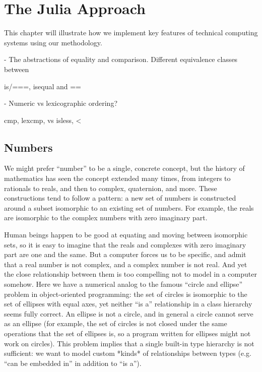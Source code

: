 \chapter{The Julia Approach}

This chapter will illustrate how we implement key features of technical computing
systems using our methodology.

- The abstractions of equality and comparison. Different equivalence classes between

is/===, isequal and ==

- Numeric vs lexicographic ordering?

cmp, lexcmp, vs isless, <

\section{Numbers}

We might prefer ``number'' to be a single,
concrete concept, but the history of mathematics has seen the concept
extended many times, from integers to rationals to reals, and then to complex,
quaternion, and more. These constructions tend to follow a pattern: a new set
of numbers is constructed around a subset isomorphic to an existing set of
numbers. For example, the reals are isomorphic to the complex numbers with
zero imaginary part.

Human beings happen to be good at equating and moving between isomorphic sets,
so it is easy to imagine that the reals and complexes with zero imaginary
part are one and the same. But a computer forces us to be specific, and admit
that a real number is not complex, and a complex number is not real. And yet
the close relationship between them is too compelling not to model in a
computer somehow. Here we have a numerical analog to the famous ``circle and
ellipse'' problem in object-oriented programming: the set of circles is
isomorphic to the set of ellipses with equal axes, yet neither ``is a''
relationship in a class hierarchy seems fully correct. An ellipse is not
a circle, and in general a circle cannot serve as an ellipse (for example,
the set of circles is not closed under the same operations that the set of
ellipses is, so a program written for ellipses might not work on circles).
This problem implies that a single built-in type hierarchy is not
sufficient: we want to model custom *kinds* of relationships between
types (e.g. ``can be embedded in'' in addition to ``is a'').

